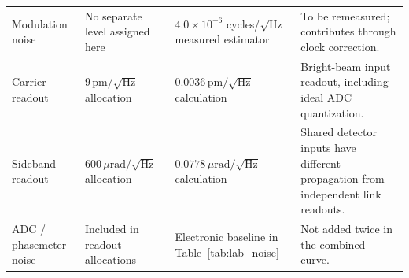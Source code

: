 \begin{table}[t]
\begin{tabular}{llll}
\parbox[t]{0.18\textwidth}{\raggedright Modulation noise\par\vspace{3pt}} & \parbox[t]{0.24\textwidth}{\raggedright No separate level assigned here\par\vspace{3pt}} & \parbox[t]{0.24\textwidth}{\raggedright $4.0\times10^{-6}$ cycles/$\sqrt{\mathrm{Hz}}$ measured estimator\par\vspace{3pt}} & \parbox[t]{0.24\textwidth}{\raggedright To be remeasured; contributes through clock correction.\par\vspace{3pt}} \\[5pt]
\parbox[t]{0.18\textwidth}{\raggedright Carrier readout\par\vspace{3pt}} & \parbox[t]{0.24\textwidth}{\raggedright $9\,\mathrm{pm}/\sqrt{\mathrm{Hz}}$ allocation\par\vspace{3pt}} & \parbox[t]{0.24\textwidth}{\raggedright $0.0036\,\mathrm{pm}/\sqrt{\mathrm{Hz}}$ calculation\par\vspace{3pt}} & \parbox[t]{0.24\textwidth}{\raggedright Bright-beam input readout, including ideal ADC quantization.\par\vspace{3pt}} \\[5pt]
\parbox[t]{0.18\textwidth}{\raggedright Sideband readout\par\vspace{3pt}} & \parbox[t]{0.24\textwidth}{\raggedright $600\,\mu\mathrm{rad}/\sqrt{\mathrm{Hz}}$ allocation\par\vspace{3pt}} & \parbox[t]{0.24\textwidth}{\raggedright $0.0778\,\mu\mathrm{rad}/\sqrt{\mathrm{Hz}}$ calculation\par\vspace{3pt}} & \parbox[t]{0.24\textwidth}{\raggedright Shared detector inputs have different propagation from independent link readouts.\par\vspace{3pt}} \\[5pt]
\parbox[t]{0.18\textwidth}{\raggedright ADC / phasemeter noise\par\vspace{3pt}} & \parbox[t]{0.24\textwidth}{\raggedright Included in readout allocations\par\vspace{3pt}} & \parbox[t]{0.24\textwidth}{\raggedright Electronic baseline in Table~\ref{tab:lab_noise}\par\vspace{3pt}} & \parbox[t]{0.24\textwidth}{\raggedright Not added twice in the combined curve.\par\vspace{3pt}} \\[5pt]
\hline
\end{tabular}
\end{table}

